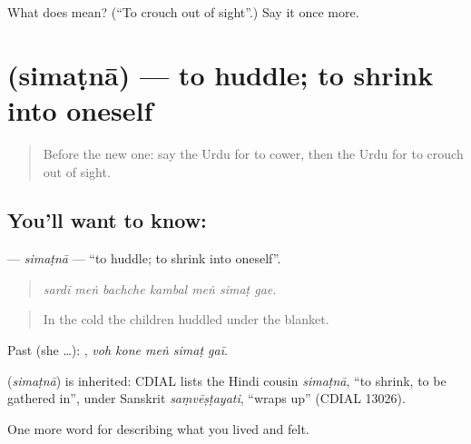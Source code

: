 \begin{tcolorbox}[breakable,colback=teal!4,colframe=teal!35!black,title={Before you move on}]
What does  mean? (\textquotedblleft{}To crouch out of sight\textquotedblright{}.) Say it once more.
\end{tcolorbox}
\section[\texorpdfstring{\ur{سمٹنا} (simaṭnā)}{سمٹنا (simaṭnā)}]{ (simaṭnā) — to huddle; to shrink into oneself}

\label{lesson:UR-C445-simatna}



\begin{quote}
Before the new one: say the Urdu for to cower, then the Urdu for to crouch out of sight.
\end{quote}

\subsection*{You'll want to know: }
\textbf{} — \emph{simaṭnā} — \textquotedblleft{}to huddle; to shrink into oneself\textquotedblright{}.

\begin{quote}
      
\end{quote}

\begin{quote}
\emph{sardī meṅ bachche kambal meṅ simaṭ gae.}
\end{quote}

\begin{quote}
In the cold the children huddled under the blanket.
\end{quote}

Past (she …):     , \emph{voh kone meṅ simaṭ gaī}.

\begin{cousinweb}
\textbf{} (\emph{simaṭnā}) is inherited: CDIAL lists the Hindi cousin \emph{simaṭnā}, \textquotedblleft{}to shrink, to be gathered in\textquotedblright{}, under Sanskrit \emph{saṃvēṣṭayati}, \textquotedblleft{}wraps up\textquotedblright{} (CDIAL 13026).
\end{cousinweb}

\begin{grammarlens}[title={What you've built}]
One more word for describing what you lived and felt.
\end{grammarlens}

